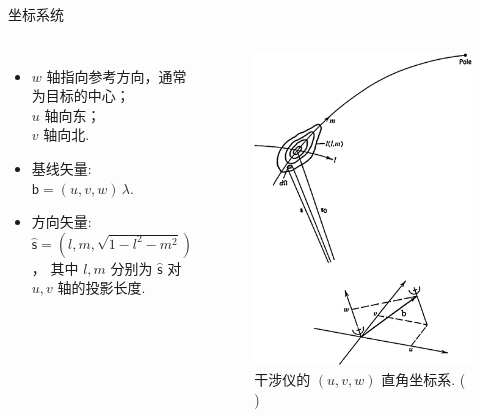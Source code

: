 \documentclass{beamer}
\newcommand{\B}[1]{\bm{\mathsf{#1}}}  %
\newcommand{\citeay}[1]{\citeauthor{#1} \citeyear{#1} \parencite{#1}}
\begin{document}
\begin{frame}{坐标系统}
  \begin{columns}
    \begin{itemize}
      \item $w$ 轴指向参考方向，通常为目标的中心； \\
        $u$ 轴向东； \\
        $v$ 轴向北.
      \item 基线矢量: $\B{b} = (u,v,w) \,\lambda$.
      \item 方向矢量: $\hat{\B{s}} = \left( l, m, \sqrt{1-l^2-m^2} \right)$，
        其中 $l, m$ 分别为 $\hat{\B{s}}$ 对 $u, v$ 轴的投影长度.
    \end{itemize}

    \begin{figure}
      \centering
      \includegraphics[width=\columnwidth]{interferometer-coordsys}
      \caption{干涉仪的 $(u,v,w)$ 直角坐标系. (\citeay{thompson2017})}
    \end{figure}
  \end{columns}
\end{frame}
\end{document}
